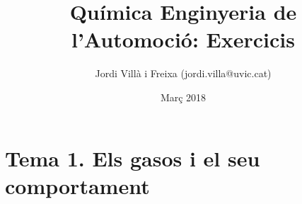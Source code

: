 \documentclass[12pt]{article}
\title{Química Enginyeria de l'Automoció: Exercicis}
\date{Març 2018}
\author{Jordi Vill\`a i Freixa (jordi.villa@uvic.cat)}
\begin{document}
\section{Tema 1. Els gasos i el seu comportament}



\end{document}
